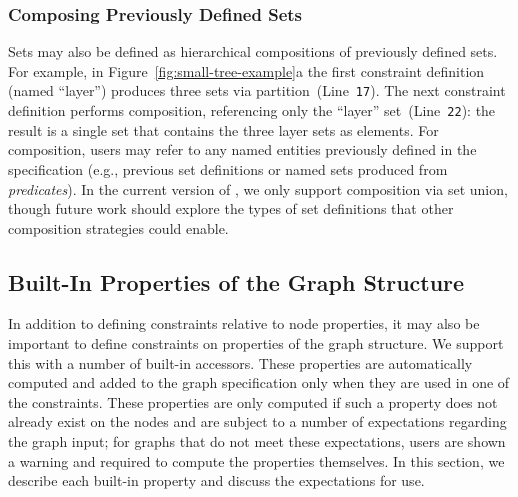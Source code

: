 \vspace{10px}
\subsubsection{Composing Previously Defined Sets}
Sets may also be defined as hierarchical
compositions of previously defined sets. For example, in
Figure~\ref{fig:small-tree-example}a the first constraint definition
(named ``layer'') produces three sets via
partition~(Line~\texttt{17}). The next constraint definition performs 
composition, referencing only the ``layer'' set~(Line~\texttt{22}): the result
is a single set that contains the three layer sets as elements.
For composition, users may
refer to any named entities previously defined in the specification (e.g.,
previous set definitions or named sets produced from \emph{predicates}).
In the current version of \projectname, we only support composition via
set union, though future work should explore the types of set definitions
that other composition strategies could enable.

\subsection{Built-In Properties of the Graph Structure}
\label{sec:built-in-properties}

In addition to defining constraints relative to node properties, it may
also be important to define constraints on properties
of the graph structure.  We support this with a number of built-in accessors.
These properties are automatically computed and added to the graph 
specification only when they are used in one of the \projectname constraints. 
These properties are only computed if such a property does not
already exist on the nodes and are subject to a number of expectations
regarding the graph input; for graphs that do not meet these expectations,
users are shown a warning and required to compute the properties
themselves. In this section, we describe each built-in property and discuss 
the expectations for use.


